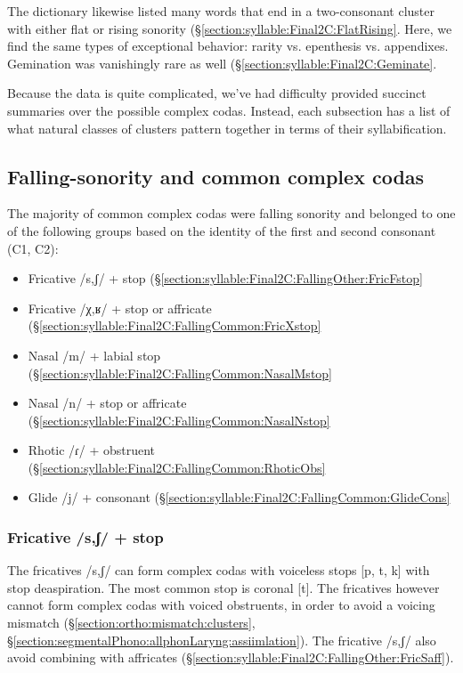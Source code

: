 	The dictionary likewise listed many words that end in a two-consonant cluster with either flat or rising sonority (\S\ref{section:syllable:Final2C:FlatRising}. Here, we find the same types of exceptional behavior: rarity vs. epenthesis vs. appendixes. Gemination was vanishingly rare as well (\S\ref{section:syllable:Final2C:Geminate}. 
	
	
	Because the data is quite complicated, we've had difficulty provided succinct summaries over the possible complex codas. Instead, each subsection has a list of what natural classes of clusters pattern together in terms of their syllabification. 
	
	
	
	\subsection{Falling-sonority and common complex codas}\label{section:syllable:Final2C:FallingCommon}
	The majority of common complex codas were falling sonority and belonged to one of the following groups based on the identity of the first and second consonant (C1, C2): 
	
	\begin{itemize}[noitemsep,topsep=0pt]
		\item Fricative /s,ʃ/ + stop (\S\ref{section:syllable:Final2C:FallingOther:FricFstop}
		\item Fricative /χ,ʁ/ + stop or affricate (\S\ref{section:syllable:Final2C:FallingCommon:FricXstop}
		\item Nasal /m/ + labial stop (\S\ref{section:syllable:Final2C:FallingCommon:NasalMstop}
		\item Nasal /n/ +   stop or affricate (\S\ref{section:syllable:Final2C:FallingCommon:NasalNstop}
		\item Rhotic /ɾ/ +   obstruent (\S\ref{section:syllable:Final2C:FallingCommon:RhoticObs}
		\item Glide /j/ +   consonant (\S\ref{section:syllable:Final2C:FallingCommon:GlideCons}
	\end{itemize}
	\subsubsection{Fricative /s,ʃ/ + stop}\label{section:syllable:Final2C:FallingCommon:FricSstop}
	The fricatives /s,ʃ/ can form complex codas with voiceless stops [p, t, k] with stop deaspiration. The most common stop is coronal [t].  The fricatives however cannot form complex codas with voiced obstruents, in order to avoid a voicing mismatch (\S\ref{section:ortho:mismatch:clusters}, \S\ref{section:segmentalPhono:allphonLaryng:assiimlation}). The fricative /s,ʃ/   also avoid combining with affricates (\S\ref{section:syllable:Final2C:FallingOther:FricSaff}). 
	
